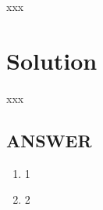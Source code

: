 
xxx

\section*{Solution}

xxx

\vfill
\subsection*{ANSWER}
\begin{enumerate}
    \item 1
    \item 2
\end{enumerate}